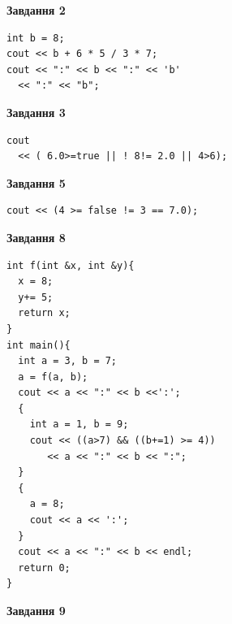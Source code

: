 \documentclass[12pt, ukrainian]{article}
\begin{document}
{\begin {large}
\begin{minipage}[t]{7.0cm}
\end{minipage}
\vline \hspace{1mm}
\begin{minipage}[t]{11.0cm}

\begin{center}
\textbf{Завдання 2}
\end{center}
\vspace{-8mm}

\begin{verbatim}
int b = 8;
cout << b + 6 * 5 / 3 * 7;
cout << ":" << b << ":" << 'b' 
  << ":" << "b";
\end{verbatim}



\begin{center}
\textbf{Завдання 3}
\end{center}
\vspace{-8mm}

\begin{verbatim}
cout 
  << ( 6.0>=true || ! 8!= 2.0 || 4>6);
\end{verbatim}



\begin{center}
\textbf{Завдання 5}
\end{center}
\vspace{-8mm}

\begin{verbatim}
cout << (4 >= false != 3 == 7.0);
\end{verbatim}



\begin{center}
\textbf{Завдання 8}
\end{center}
\vspace{-8mm}

\begin{verbatim}
int f(int &x, int &y){
  x = 8;
  y+= 5;
  return x;
}
int main(){
  int a = 3, b = 7;
  a = f(a, b);
  cout << a << ":" << b <<':';
  {
    int a = 1, b = 9;
    cout << ((a>7) && ((b+=1) >= 4))
       << a << ":" << b << ":";
  }
  {
    a = 8;
    cout << a << ':';
  }
  cout << a << ":" << b << endl;
  return 0;
}
\end{verbatim}

\end{minipage}


\begin{minipage}[t]{7.0cm}

\begin{center}
\textbf{Завдання 9}
\end{center}
\vspace{-8mm}


\end{minipage}
\end{large}}
\end{document}
